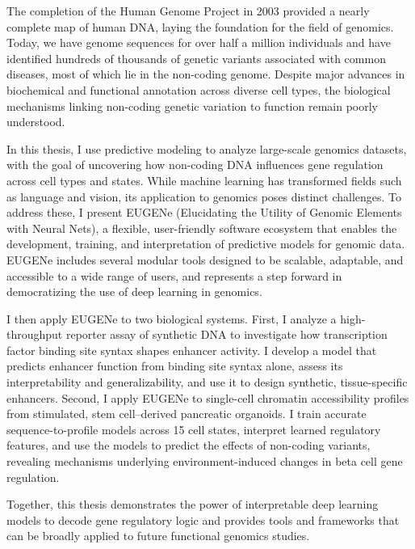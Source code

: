\documentclass[11pt]{formatting-template}
\begin{document}
\begin{dissertationabstract}

		The completion of the Human Genome Project in 2003 provided a nearly complete map of human DNA, laying the foundation for the field of genomics. Today, we have genome sequences for over half a million individuals and have identified hundreds of thousands of genetic variants associated with common diseases, most of which lie in the non-coding genome. Despite major advances in biochemical and functional annotation across diverse cell types, the biological mechanisms linking non-coding genetic variation to function remain poorly understood.

		In this thesis, I use predictive modeling to analyze large-scale genomics datasets, with the goal of uncovering how non-coding DNA influences gene regulation across cell types and states. While machine learning has transformed fields such as language and vision, its application to genomics poses distinct challenges. To address these, I present EUGENe (Elucidating the Utility of Genomic Elements with Neural Nets), a flexible, user-friendly software ecosystem that enables the development, training, and interpretation of predictive models for genomic data. EUGENe includes several modular tools designed to be scalable, adaptable, and accessible to a wide range of users, and represents a step forward in democratizing the use of deep learning in genomics.

		I then apply EUGENe to two biological systems. First, I analyze a high-throughput reporter assay of synthetic DNA to investigate how transcription factor binding site syntax shapes enhancer activity. I develop a model that predicts enhancer function from binding site syntax alone, assess its interpretability and generalizability, and use it to design synthetic, tissue-specific enhancers. Second, I apply EUGENe to single-cell chromatin accessibility profiles from stimulated, stem cell–derived pancreatic organoids. I train accurate sequence-to-profile models across 15 cell states, interpret learned regulatory features, and use the models to predict the effects of non-coding variants, revealing mechanisms underlying environment-induced changes in beta cell gene regulation.

		Together, this thesis demonstrates the power of interpretable deep learning models to decode gene regulatory logic and provides tools and frameworks that can be broadly applied to future functional genomics studies.

\end{dissertationabstract}
\end{document}
